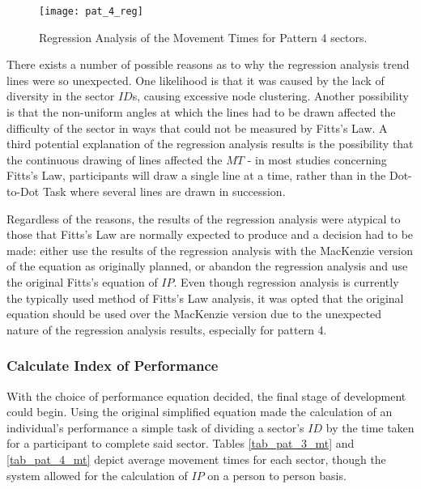 			\begin{figure}[]
				\centering
				\texttt{[image: pat\_4\_reg]}
				\caption{Regression Analysis of the Movement Times for Pattern 4 sectors.}
				\label{fig_pat_4_reg}
			\end{figure}
			
			There exists a number of possible reasons as to why the regression analysis trend lines were so unexpected. One likelihood is that it was caused by the lack of diversity in the sector \(ID\)s, causing excessive node clustering. Another possibility is that the non-uniform angles at which the lines had to be drawn affected the difficulty of the sector in ways that could not be measured by Fitts’s Law. A third potential explanation of the regression analysis results is the possibility that the continuous drawing of lines affected the \(MT\) - in most studies concerning Fitts’s Law, participants will draw a single line at a time, rather than in the Dot-to-Dot Task where several lines are drawn in succession. 
		
			Regardless of the reasons, the results of the regression analysis were atypical to those that Fitts’s Law are normally expected to produce and a decision had to be made: either use the results of the regression analysis with the MacKenzie version of the equation as originally planned, or abandon the regression analysis and use the original Fitts’s equation of \(IP\). Even though regression analysis is currently the typically used method of Fitts’s Law analysis, it was opted that the original equation should be used over the MacKenzie version due to the unexpected nature of the regression analysis results, especially for pattern 4.
			
		\subsubsection{Calculate Index of Performance}
			With the choice of performance equation decided, the final stage of development could begin. Using the original simplified equation made the calculation of an individual's performance a simple task of dividing a sector’s \(ID\) by the time taken for a participant to complete said sector. Tables \ref{tab_pat_3_mt} and \ref{tab_pat_4_mt} depict average movement times for each sector, though the system allowed for the calculation of \(IP\) on a person to person basis.
			
